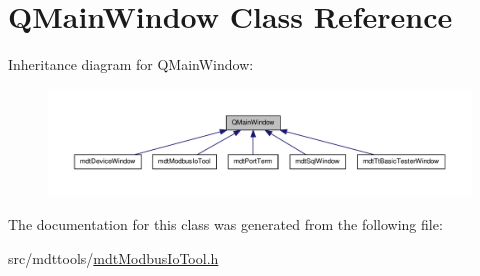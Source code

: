 \hypertarget{class_q_main_window}{\section{Q\-Main\-Window Class Reference}
\label{class_q_main_window}
}


Inheritance diagram for Q\-Main\-Window\-:
\nopagebreak
\begin{figure}[H]
\begin{center}
\leavevmode
\includegraphics[width=350pt]{class_q_main_window__inherit__graph}
\end{center}
\end{figure}


The documentation for this class was generated from the following file\-:\begin{DoxyCompactItemize}
\item 
src/mdttools/\hyperlink{mdt_modbus_io_tool_8h}{mdt\-Modbus\-Io\-Tool.\-h}\end{DoxyCompactItemize}
